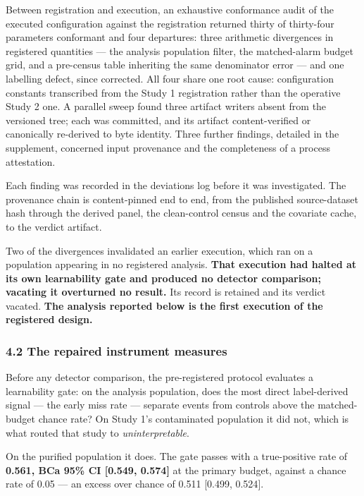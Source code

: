 \documentclass[
  11pt,
]{article}
\begin{document}
Between registration and execution, an exhaustive conformance audit of
the executed configuration against the registration returned thirty of
thirty-four parameters conformant and four departures: three arithmetic
divergences in registered quantities --- the analysis population filter,
the matched-alarm budget grid, and a pre-census table inheriting the
same denominator error --- and one labelling defect, since corrected.
All four share one root cause: configuration constants transcribed from
the Study 1 registration rather than the operative Study 2 one. A
parallel sweep found three artifact writers absent from the versioned
tree; each was committed, and its artifact content-verified or
canonically re-derived to byte identity. Three further findings,
detailed in the supplement, concerned input provenance and the
completeness of a process attestation.

Each finding was recorded in the deviations log before it was
investigated. The provenance chain is content-pinned end to end, from
the published source-dataset hash through the derived panel, the
clean-control census and the covariate cache, to the verdict artifact.

Two of the divergences invalidated an earlier execution, which ran on a
population appearing in no registered analysis. \textbf{That execution
had halted at its own learnability gate and produced no detector
comparison; vacating it overturned no result.} Its record is retained
and its verdict vacated. \textbf{The analysis reported below is the
first execution of the registered design.}

\subsubsection{4.2 The repaired instrument
measures}\label{the-repaired-instrument-measures}

Before any detector comparison, the pre-registered protocol evaluates a
learnability gate: on the analysis population, does the most direct
label-derived signal --- the early miss rate --- separate events from
controls above the matched-budget chance rate? On Study 1's contaminated
population it did not, which is what routed that study to
\emph{uninterpretable}.

On the purified population it does. The gate passes with a true-positive
rate of \textbf{0.561, BCa 95\% CI {[}0.549, 0.574{]}} at the primary
budget, against a chance rate of 0.05 --- an excess over chance of 0.511
{[}0.499, 0.524{]}.
\end{document}
